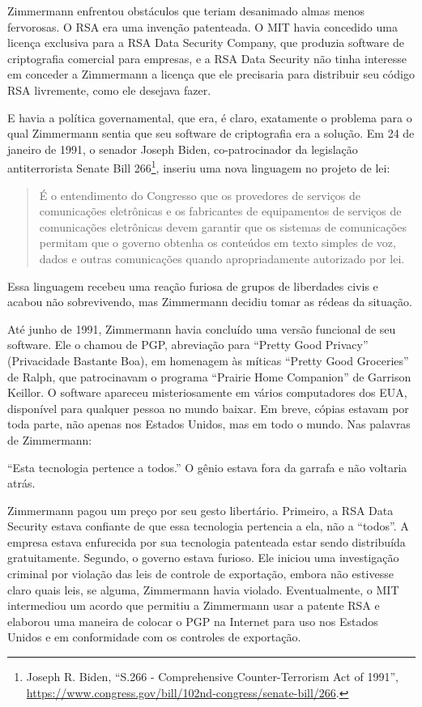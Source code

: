 \documentclass{book}
\begin{document}
Zimmermann enfrentou obstáculos que teriam desanimado almas menos fervorosas. O RSA era uma invenção patenteada. O MIT havia concedido uma licença exclusiva para a RSA Data Security Company, que produzia software de criptografia comercial para empresas, e a RSA Data Security não tinha interesse em conceder a Zimmermann a licença que ele precisaria para distribuir seu código RSA livremente, como ele desejava fazer.

E havia a política governamental, que era, é claro, exatamente o problema para o qual Zimmermann sentia que seu software de criptografia era a solução. Em 24 de janeiro de 1991, o senador Joseph Biden, co-patrocinador da legislação antiterrorista Senate Bill 266\footnote{Joseph R. Biden, “S.266 - Comprehensive Counter-Terrorism Act of 1991”, \url{https://www.congress.gov/bill/102nd-congress/senate-bill/266}.}, inseriu uma nova linguagem no projeto de lei:
\begin{quote}
    É o entendimento do Congresso que os provedores de serviços de comunicações eletrônicas e os fabricantes de equipamentos de serviços de comunicações eletrônicas devem garantir que os sistemas de comunicações permitam que o governo obtenha os conteúdos em texto simples de voz, dados e outras comunicações quando apropriadamente autorizado por lei.
\end{quote}

Essa linguagem recebeu uma reação furiosa de grupos de liberdades civis e acabou não sobrevivendo, mas Zimmermann decidiu tomar as rédeas da situação.

Até junho de 1991, Zimmermann havia concluído uma versão funcional de seu software. Ele o chamou de PGP, abreviação para ``Pretty Good Privacy'' (Privacidade Bastante Boa), em homenagem às míticas ``Pretty Good Groceries'' de Ralph, que patrocinavam o programa ``Prairie Home Companion'' de Garrison Keillor. O software apareceu misteriosamente em vários computadores dos EUA, disponível para qualquer pessoa no mundo baixar. Em breve, cópias estavam por toda parte, não apenas nos Estados Unidos, mas em todo o mundo. Nas palavras de Zimmermann:

``Esta tecnologia pertence a todos.'' O gênio estava fora da garrafa e não voltaria atrás.

Zimmermann pagou um preço por seu gesto libertário. Primeiro, a RSA Data Security estava confiante de que essa tecnologia pertencia a ela, não a ``todos''. A empresa estava enfurecida por sua tecnologia patenteada estar sendo distribuída gratuitamente. Segundo, o governo estava furioso. Ele iniciou uma investigação criminal por violação das leis de controle de exportação, embora não estivesse claro quais leis, se alguma, Zimmermann havia violado. Eventualmente, o MIT intermediou um acordo que permitiu a Zimmermann usar a patente RSA e elaborou uma maneira de colocar o PGP na Internet para uso nos Estados Unidos e em conformidade com os controles de exportação.
\end{document}
